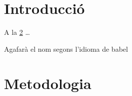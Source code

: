 \documentclass{article}
\begin{document}
\section{Introducció}
\label{sec:intro}

A la \cref{sec:metod} \dots

Agafarà el nom segons l'idioma 
de babel

\section{Metodologia}
\label{sec:metod}
 
\end{document}
